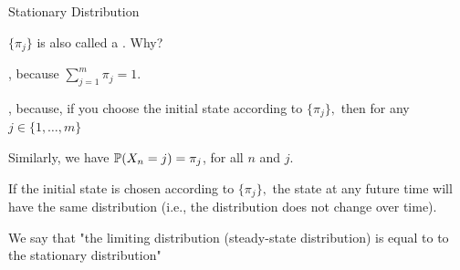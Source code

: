 \begin{frame}{Stationary Distribution}

\plitemsep 0.1in
\bci

\item<2-> $\{ \pi_j \}$ is also called a . Why?

\item<3-> , because $\sum_{j=1}^m \pi_j =1.$

\item<4-> , because, if you choose the initial state
  according to $\{\pi_j \},$ then for any $j \in \{1, \ldots, m \}$ 

\bci
\item<7-> Similarly, we have $\mathbb{P}( X_n = j ) = \pi_j$, for all $n$ and $j.$

\item<8-> If the initial state is chosen according to $\{\pi_j \},$ the state at any future time will have the same distribution (i.e., the distribution does not change over time). 

\eci

\item<9-> We say that "the limiting distribution (steady-state
  distribution) is equal to to the stationary distribution"

\eci


\end{frame}



